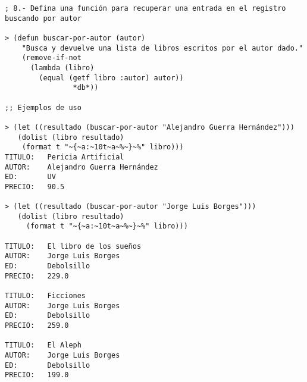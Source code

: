 \documentclass[11pt, letterpaper]{article}
\begin{document}
\begin{itemize}
	\begin{verbatim}
; 8.- Defina una función para recuperar una entrada en el registro buscando por autor
	
> (defun buscar-por-autor (autor)
    "Busca y devuelve una lista de libros escritos por el autor dado."
	(remove-if-not 
      (lambda (libro)
	    (equal (getf libro :autor) autor))
	            *db*))
	
;; Ejemplos de uso
	
> (let ((resultado (buscar-por-autor "Alejandro Guerra Hernández")))
   (dolist (libro resultado)
    (format t "~{~a:~10t~a~%~}~%" libro)))
TITULO:   Pericia Artificial
AUTOR:    Alejandro Guerra Hernández
ED:       UV
PRECIO:   90.5

> (let ((resultado (buscar-por-autor "Jorge Luis Borges")))
   (dolist (libro resultado)
     (format t "~{~a:~10t~a~%~}~%" libro)))

TITULO:   El libro de los sueños
AUTOR:    Jorge Luis Borges
ED:       Debolsillo
PRECIO:   229.0

TITULO:   Ficciones
AUTOR:    Jorge Luis Borges
ED:       Debolsillo
PRECIO:   259.0

TITULO:   El Aleph
AUTOR:    Jorge Luis Borges
ED:       Debolsillo
PRECIO:   199.0
	\end{verbatim}
\end{itemize}
	




\newpage






\end{document}
